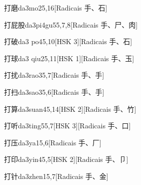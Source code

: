 \begin{entry}{打磨}{da3mo2}{5,16}[Radicais ⼿、⽯]
\end{entry}

\begin{entry}{打屁股}{da3pi4gu5}{5,7,8}[Radicais ⼿、⼫、⾁]
\end{entry}

\begin{entry}{打破}{da3 po4}{5,10}[HSK 3][Radicais ⼿、⽯]
\end{entry}

\begin{entry}{打球}{da3 qiu2}{5,11}[HSK 1][Radicais ⼿、⽟]
\end{entry}

\begin{entry}{打扰}{da3rao3}{5,7}[Radicais ⼿、⼿]
\end{entry}

\begin{entry}{打扫}{da3sao3}{5,6}[Radicais ⼿、⼿]
\end{entry}

\begin{entry}{打算}{da3suan4}{5,14}[HSK 2][Radicais ⼿、⽵]
\end{entry}

\begin{entry}{打听}{da3ting5}{5,7}[HSK 3][Radicais ⼿、⼝]
\end{entry}

\begin{entry}{打压}{da3ya1}{5,6}[Radicais ⼿、⼚]
\end{entry}

\begin{entry}{打印}{da3yin4}{5,5}[HSK 2][Radicais ⼿、⼙]
\end{entry}

\begin{entry}{打针}{da3zhen1}{5,7}[Radicais ⼿、⾦]
\end{entry}

